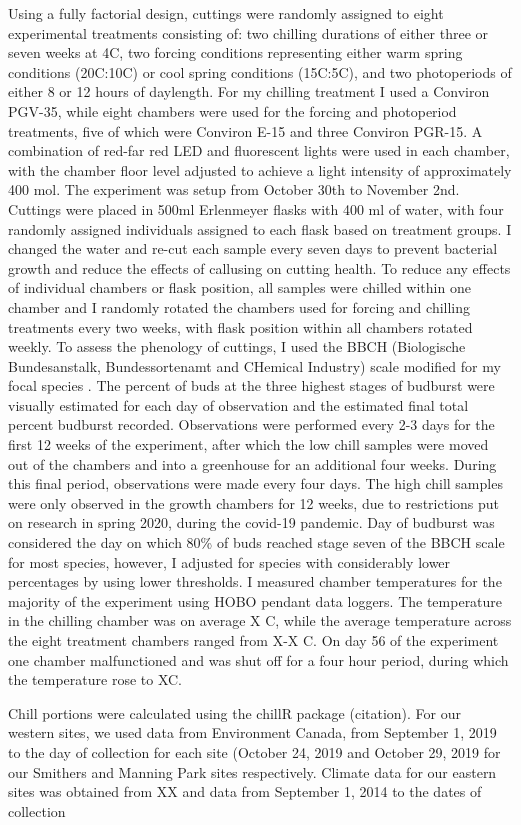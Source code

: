 \documentclass{article}\usepackage[]{graphicx}\usepackage[]{color}
\begin{document}
Using a fully factorial design, cuttings were randomly assigned to eight experimental treatments consisting of: two chilling durations of either three or seven weeks at 4\textdegree{}C, two forcing conditions representing either warm spring conditions (20\textdegree{}C:10\textdegree{}C) or cool spring conditions (15\textdegree{}C:5\textdegree{}C), and two photoperiods of either 8 or 12 hours of daylength. For my chilling treatment I used a Conviron PGV-35, while eight chambers were used for the forcing and photoperiod treatments, five of which were Conviron E-15 and three Conviron PGR-15. A combination of red-far red LED and fluorescent lights were used in each chamber, with the chamber floor level adjusted to achieve a light intensity of approximately 400 \mu mol. The experiment was setup from October 30th to November 2nd. Cuttings were placed in 500ml Erlenmeyer flasks with 400 ml of water, with four randomly assigned individuals assigned to each flask based on treatment groups. I changed the water and re-cut each sample every seven days to prevent bacterial growth and reduce the effects of callusing on cutting health. To reduce any effects of individual chambers or flask position, all samples were chilled within one chamber and I randomly rotated the chambers used for forcing and chilling treatments every two weeks, with flask position within all chambers rotated weekly. To assess the phenology of cuttings, I used the BBCH (Biologische Bundesanstalk, Bundessortenamt and CHemical Industry) scale modified for my focal species \citep{Finn2007}. The percent of buds at the three highest stages of budburst were visually estimated for each day of observation and the estimated final total percent budburst recorded. Observations were performed every 2-3 days for the first 12 weeks of the experiment, after which the low chill samples were moved out of the chambers and into a greenhouse for an additional four weeks. During this final period, observations were made every four days. The high chill samples were only observed in the growth chambers for 12 weeks, due to restrictions put on research in spring 2020, during the covid-19 pandemic. Day of budburst was considered the day on which 80\% of buds reached stage seven of the BBCH scale for most species, however, I adjusted for species with considerably lower percentages by using lower thresholds. I measured chamber temperatures for the majority of the experiment using HOBO pendant data loggers. The temperature in the chilling chamber was on average X \textdegree{}C, while the average temperature across the eight treatment chambers ranged from X-X \textdegree{}C. On day 56 of the experiment one chamber malfunctioned and was shut off for a four hour period, during which the temperature rose to X\textdegree{}C. 

Chill portions were calculated using the chillR package (citation). For our western sites, we used data from Environment Canada, from September 1, 2019 to the day of collection for each site (October 24, 2019 and October 29, 2019 for our Smithers and Manning Park sites respectively. Climate data for our eastern sites was obtained from XX and data from September 1, 2014 to the dates of collection
\end{document}
